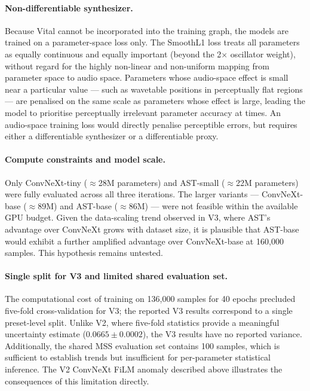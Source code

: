 \paragraph{Non-differentiable synthesizer.}
Because Vital cannot be incorporated into the training graph, the models are trained on a parameter-space loss only. The SmoothL1 loss treats all parameters as equally continuous and equally important (beyond the 2$\times$ oscillator weight), without regard for the highly non-linear and non-uniform mapping from parameter space to audio space. Parameters whose audio-space effect is small near a particular value — such as wavetable positions in perceptually flat regions — are penalised on the same scale as parameters whose effect is large, leading the model to prioritise perceptually irrelevant parameter accuracy at times. An audio-space training loss would directly penalise perceptible errors, but requires either a differentiable synthesizer or a differentiable proxy.

\paragraph{Compute constraints and model scale.}
Only ConvNeXt-tiny ($\approx$28M parameters) and AST-small ($\approx$22M parameters) were fully evaluated across all three iterations. The larger variants — ConvNeXt-base ($\approx$89M) and AST-base ($\approx$86M) — were not feasible within the available GPU budget. Given the data-scaling trend observed in V3, where AST's advantage over ConvNeXt grows with dataset size, it is plausible that AST-base would exhibit a further amplified advantage over ConvNeXt-base at 160{,}000 samples. This hypothesis remains untested.

\paragraph{Single split for V3 and limited shared evaluation set.}
The computational cost of training on 136{,}000 samples for 40 epochs precluded five-fold cross-validation for V3; the reported V3 results correspond to a single preset-level split. Unlike V2, where five-fold statistics provide a meaningful uncertainty estimate ($0.0665 \pm 0.0002$), the V3 results have no reported variance. Additionally, the shared MSS evaluation set contains 100 samples, which is sufficient to establish trends but insufficient for per-parameter statistical inference. The V2 ConvNeXt FiLM anomaly described above illustrates the consequences of this limitation directly.

